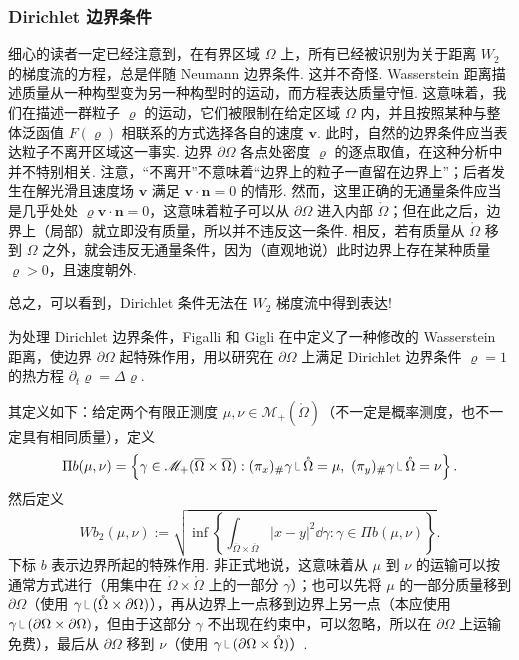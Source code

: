 \subsubsection{Dirichlet 边界条件}\label{sec:8.4.3}
细心的读者一定已经注意到，在有界区域 $\Omega$ 上，所有已经被识别为关于距离 $W_2$ 的梯度流的方程，总是伴随 Neumann 边界条件. 这并不奇怪. Wasserstein 距离描述质量从一种构型变为另一种构型时的运动，而方程表达质量守恒. 这意味着，我们在描述一群粒子 $\varrho$ 的运动，它们被限制在给定区域 $\Omega$ 内，并且按照某种与整体泛函值 $F(\varrho)$ 相联系的方式选择各自的速度 $\mathbf v$. 此时，自然的边界条件应当表达粒子不离开区域这一事实. 边界 $\partial\Omega$ 各点处密度 $\varrho$ 的逐点取值，在这种分析中并不特别相关. 注意，“不离开”不意味着“边界上的粒子一直留在边界上”；后者发生在解光滑且速度场 $\mathbf v$ 满足 $\mathbf v\cdot\mathbf n=0$ 的情形. 然而，这里正确的无通量条件应当是几乎处处 $\varrho\mathbf v\cdot\mathbf n=0$，这意味着粒子可以从 $\partial\Omega$ 进入内部 $\mathring\Omega$；但在此之后，边界上（局部）就立即没有质量，所以并不违反这一条件. 相反，若有质量从 $\mathring\Omega$ 移到 $\Omega$ 之外，就会违反无通量条件，因为（直观地说）此时边界上存在某种质量 $\varrho>0$，且速度朝外.

总之，可以看到，Dirichlet 条件无法在 $W_2$ 梯度流中得到表达!

\label{idx:i75-p312}
为处理 Dirichlet 边界条件，Figalli 和 Gigli 在\cite{b165}中定义了一种修改的 Wasserstein 距离，使边界 $\partial\Omega$ 起特殊作用，用以研究在 $\partial\Omega$ 上满足 Dirichlet 边界条件 $\varrho=1$ 的热方程 $\partial_t\varrho=\Delta\varrho$.

其定义如下：给定两个有限正测度 $\mu,\nu\in\mathscr M_+(\mathring\Omega)$（不一定是概率测度，也不一定具有相同质量），定义
\[
\Pi b(\mu,\nu)=\left\{\gamma\in\mathscr M_+(\overline\Omega\times\overline\Omega):
(\pi_x)_\#\gamma\restr\mathring\Omega=\mu,\ (\pi_y)_\#\gamma\restr\mathring\Omega=\nu\right\}.
\]
然后定义
\[
Wb_2(\mu,\nu):=\sqrt{\inf\left\{\int_{\overline\Omega\times\overline\Omega}|x-y|^2\dd\gamma:
\gamma\in\Pi b(\mu,\nu)\right\}}.
\]
下标 $b$ 表示边界所起的特殊作用. 非正式地说，这意味着从 $\mu$ 到 $\nu$ 的运输可以按通常方式进行（用集中在 $\mathring\Omega\times\mathring\Omega$ 上的一部分 $\gamma$）；也可以先将 $\mu$ 的一部分质量移到 $\partial\Omega$（使用 $\gamma\restr(\mathring\Omega\times\partial\Omega)$），再从边界上一点移到边界上另一点（本应使用 $\gamma\restr(\partial\Omega\times\partial\Omega)$，但由于这部分 $\gamma$ 不出现在约束中，可以忽略，所以在 $\partial\Omega$ 上运输免费），最后从 $\partial\Omega$ 移到 $\nu$（使用 $\gamma\restr(\partial\Omega\times\mathring\Omega)$）.

